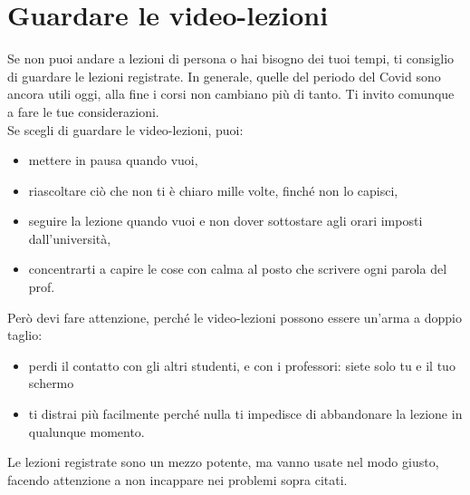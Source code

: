 \documentclass{article}
\begin{document}
\section{Guardare le video-lezioni}
Se non puoi andare a lezioni di persona o hai bisogno dei tuoi tempi, ti consiglio di guardare le lezioni registrate. In generale, quelle del periodo del Covid sono ancora utili oggi, alla fine i corsi non cambiano più di tanto. Ti invito comunque a fare le tue considerazioni.\\
Se scegli di guardare le video-lezioni, puoi:
\begin{itemize}
\item mettere in pausa quando vuoi,
\item riascoltare ciò che non ti è chiaro mille volte, finché non lo capisci, 
\item seguire la lezione quando vuoi e non dover sottostare agli orari imposti dall'università, 
\item concentrarti a capire le cose con calma al posto che scrivere ogni parola del prof. 
\end{itemize}%
Però devi fare attenzione, perché le video-lezioni possono essere un'arma a doppio taglio:
\begin{itemize}
\item perdi il contatto con gli altri studenti, e con i professori: siete solo tu e il tuo schermo
\item ti distrai più facilmente perché nulla ti impedisce di abbandonare la lezione in qualunque momento.
\end{itemize}%
Le lezioni registrate sono un mezzo potente, ma vanno usate nel modo giusto, facendo attenzione a non incappare nei problemi sopra citati.
\end{document}
